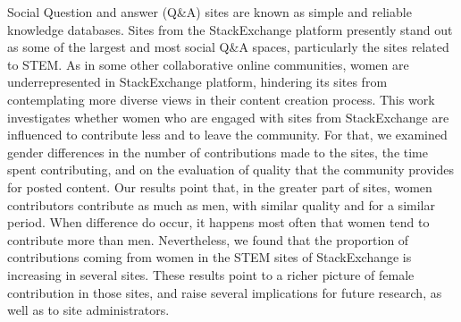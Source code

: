 Social Question and answer (Q\&A) sites are known as simple and reliable knowledge databases. Sites from the StackExchange platform presently stand out as some of the largest and most social Q\&A spaces, particularly the sites related to STEM. As in some other collaborative online communities, women are underrepresented in StackExchange platform, hindering its sites from contemplating more diverse views in their content creation process. This work investigates whether women who are engaged with sites from StackExchange are influenced to contribute less and to leave the community.  For that, we examined gender differences in the number of contributions made to the sites, the time spent contributing, and on the evaluation of quality that the community provides for posted content. Our results point that, in the greater part of sites, women contributors contribute as much as men, with similar quality and for a similar period. When difference do occur, it happens most often that women tend to contribute more than men. 
Nevertheless, we found that the proportion of contributions coming from women in the STEM sites of StackExchange is increasing in several sites. These results point to a richer picture of female contribution in those sites, and raise several implications for future research, as well as to site administrators.  

